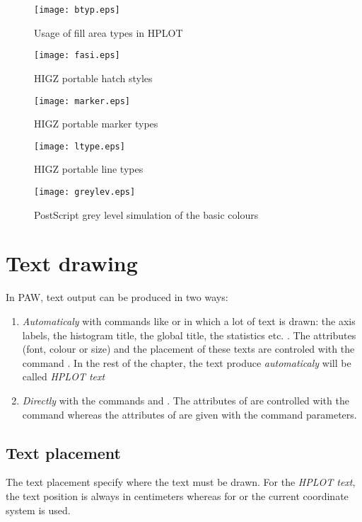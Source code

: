 \begin{sidewaysfigure}
\begin{minipage}{.49\textheight}
\centering\texttt{[image: btyp.eps]}
\caption{Usage of fill area types in HPLOT}
\label{fig:BTYP}
\end{minipage}\hfill
\begin{minipage}{.49\textheight}
\centering\texttt{[image: fasi.eps]}
\caption{HIGZ portable hatch styles}
\label{fig:HATCH}
\end{minipage}
\end{sidewaysfigure}

\begin{figure}[p]
\centering\texttt{[image: marker.eps]}
\caption{HIGZ portable marker types}
\label{fig:MTYPE}

\centering\texttt{[image: ltype.eps]}
\caption{HIGZ portable line types}
\label{fig:LTYPE}

\centering\texttt{[image: greylev.eps]}
\caption{PostScript grey level simulation of the basic colours}
\label{fig:GREYLEV}
\end{figure}

\section{Text drawing}
In PAW, text output can be produced in two ways:
\begin{enumerate}
\item {\em Automaticaly} with commands like  or 
       in which a lot of text is drawn: the axis labels, the
      histogram title, the global title, the statistics etc. . The attributes
      (font, colour or size) and the placement of these texts are controled 
      with the command . In the rest of the chapter, the text
      produce {\em automaticaly} will be called {\em HPLOT text}
\item {\em Directly} with the commands  and . The 
      attributes of  are controlled with the command 
       whereas the attributes of  are given
      with the command parameters.
\end{enumerate}

\subsection*{Text placement}
The text placement specify where the text must be drawn. For the
{\em HPLOT text}, the text position  is always in centimeters whereas for
 or  the current coordinate system is used. 
